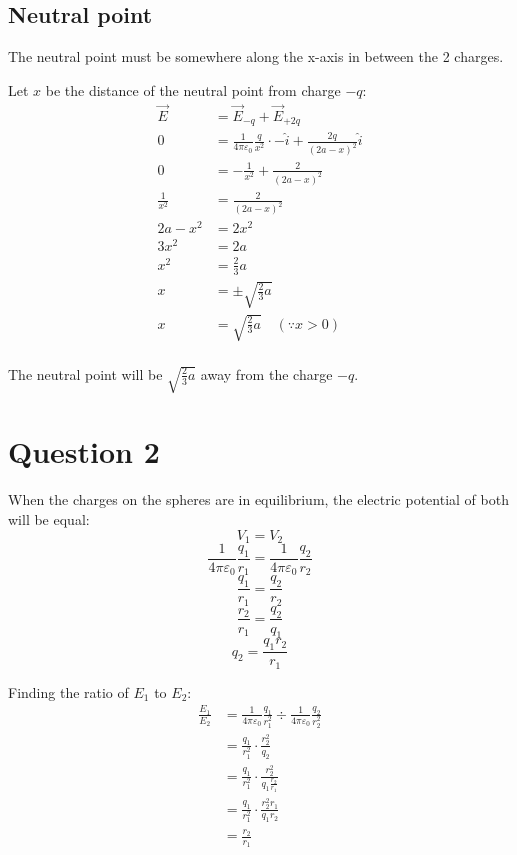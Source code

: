 \documentclass[11pt]{article}
\begin{document}
\newpage
\subsection{Neutral point}
\label{sec:org6989ee2}
The neutral point must be somewhere along the x-axis in between the 2 charges.


Let \(x\) be the distance of the neutral point from charge \(-q\):
\begin{align*}
\vec{E} &= \vec{E}_{-q} + \vec{E}_{+2q} \\
0 &= \frac{1}{4 \pi \varepsilon_0} \frac{q}{x^2} \cdot -\hat{i} + \frac{2q}{(2a - x)^2} \hat{i} \\
0 &= -\frac{1}{x^2} + \frac{2}{(2a - x)^2} \\
\frac{1}{x^2} &= \frac{2}{(2a - x)^2} \\
2a - x^2 &= 2x^2 \\
3x^2 &= 2a \\
x^2 &= \frac{2}{3} a \\
x &= \pm \sqrt{\frac{2}{3} a} \\
x &= \sqrt{\frac{2}{3} a} \quad (\because x > 0) \\
\end{align*}

The neutral point will be \(\sqrt{\frac{2}{3}a}\) away from the charge \(-q\).

\newpage
\section{Question 2}
\label{sec:org3913446}
When the charges on the spheres are in equilibrium, the electric potential of both will be equal:
\[V_1 = V_2\]
\[\frac{1}{4 \pi \varepsilon_0} \frac{q_1}{r_1} = \frac{1}{4 \pi \varepsilon_0} \frac{q_2}{r_2}\]
\[\frac{q_1}{r_1} = \frac{q_2}{r_2}\]
\[\frac{r_2}{r_1} = \frac{q_2}{q_1}\]
\[q_2 = \frac{q_1 r_2}{r_1}\]

Finding the ratio of \(E_1\) to \(E_2\):
\begin{align*}
\frac{E_1}{E_2} &= \frac{1}{4 \pi \varepsilon_0} \frac{q_1}{r_1^2} \div \frac{1}{4 \pi \varepsilon_0} \frac{q_2}{r_2^2} \\
&= \frac{q_1}{r_1^2} \cdot \frac{r_2^2}{q_2} \\
&= \frac{q_1}{r_1^2} \cdot \frac{r_2^2}{q_1 \frac{r_2}{r_1}} \\
&= \frac{q_1}{r_1^2} \cdot \frac{r_2^2 r_1}{q_1 r_2} \\
&= \frac{r_2}{r_1} \\
\end{align*}
\end{document}
